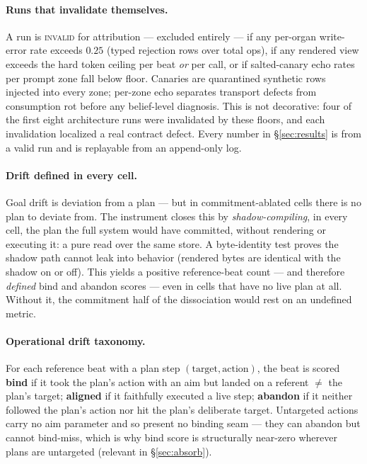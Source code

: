 \documentclass{article}
\begin{document}
\paragraph{Runs that invalidate themselves.} A run is \textsc{invalid} for
attribution --- excluded entirely --- if any per-organ write-error rate exceeds
$0.25$ (typed rejection rows over total ops), if any rendered view exceeds the
hard token ceiling per beat \emph{or} per call, or if salted-canary echo rates per
prompt zone fall below floor. Canaries are quarantined synthetic rows injected into
every zone; per-zone echo separates transport defects from consumption rot before
any belief-level diagnosis. This is not decorative: four of the first eight
architecture runs were invalidated by these floors, and each invalidation
localized a real contract defect. Every number in \S\ref{sec:results} is from a
valid run and is replayable from an append-only log.

\paragraph{Drift defined in every cell.} Goal drift is deviation from a plan --- but
in commitment-ablated cells there is no plan to deviate from. The instrument closes
this by \emph{shadow-compiling}, in every cell, the plan the full system would have
committed, without rendering or executing it: a pure read over the same store. A
byte-identity test proves the shadow path cannot leak into behavior (rendered bytes
are identical with the shadow on or off). This yields a positive reference-beat
count --- and therefore \emph{defined} bind and abandon scores --- even in cells
that have no live plan at all. Without it, the commitment half of the dissociation
would rest on an undefined metric.

\paragraph{Operational drift taxonomy.} For each reference beat with a plan step
$(\text{target}, \text{action})$, the beat is scored \textbf{bind} if it took the
plan's action with an aim but landed on a referent $\neq$ the plan's target;
\textbf{aligned} if it faithfully executed a live step; \textbf{abandon} if it
neither followed the plan's action nor hit the plan's deliberate target. Untargeted
actions carry no aim parameter and so present no binding seam --- they can abandon
but cannot bind-miss, which is why bind score is structurally near-zero wherever
plans are untargeted (relevant in \S\ref{sec:absorb}).
\end{document}
